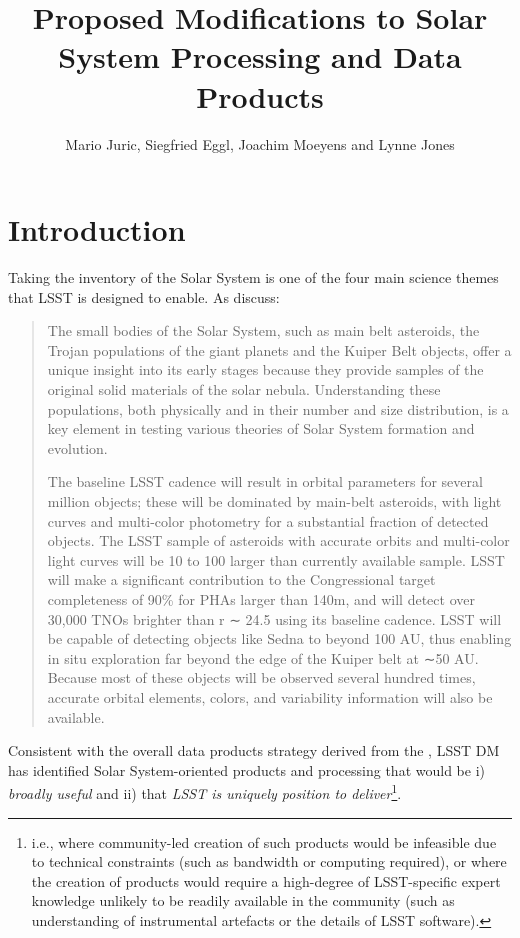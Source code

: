 \documentclass[DM,authoryear,toc]{lsstdoc}
\title[Solar System Data Products Changes]{Proposed Modifications to Solar System Processing and Data Products}
\author{%
Mario Juric,
Siegfried Eggl,
Joachim Moeyens
and Lynne Jones
}
\begin{document}
\maketitle


\section{Introduction}

Taking the inventory of the Solar System is one of the four main science themes that LSST is designed to enable. As \cite{2008arXiv0805.2366I} discuss:

\begin{quotation}
The small bodies of the Solar System, such as main belt
asteroids, the Trojan populations of the giant planets
and the Kuiper Belt objects, offer a unique insight
into its early stages because they provide samples of
the original solid materials of the solar nebula. Understanding
these populations, both physically and in their
number and size distribution, is a key element in testing
various theories of Solar System formation and evolution.

The baseline LSST cadence will result in orbital parameters
for several million objects; these will be dominated
by main-belt asteroids, with light curves and
multi-color photometry for a substantial fraction of detected
objects. The LSST sample of asteroids with accurate
orbits and multi-color light curves will be 10 to
100 larger than currently available sample. LSST will
make a significant contribution to the Congressional target
completeness of 90\% for PHAs larger than 140m, and will 
detect over 30,000 TNOs brighter than r ∼ 24.5 using 
its baseline cadence. LSST will be capable
of detecting objects like Sedna to beyond 100 AU,
thus enabling in situ exploration far beyond the edge of
the Kuiper belt at ∼50 AU. Because most of these objects
will be observed several hundred times, accurate
orbital elements, colors, and variability information will
also be available.
\end{quotation}

Consistent with the overall data products strategy derived from the ,
LSST DM has identified Solar System-oriented products and 
processing that would be i) {\em broadly useful} and ii) that 
{\em LSST is uniquely position to deliver}\footnote{i.e., where community-led
creation of such products would be infeasible due to technical
constraints (such as bandwidth or computing required), or where
the creation of products would require a high-degree of LSST-specific
expert knowledge unlikely to be readily available in the community
(such as understanding of instrumental artefacts or the details of
LSST software).}.
\end{document}
